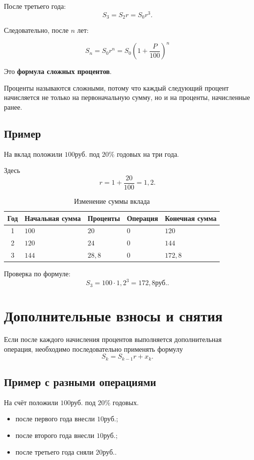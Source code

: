\documentclass[a4paper,12pt]{article}
\newcommand{\RUB}{\text{руб.}}
\newcommand{\important}[1]{\textbf{\color{darkaccent}#1}}
\newcommand{\formula}[1]{%
  \[
    \boxed{\displaystyle #1}
  \]
}
\begin{document}
После третьего года:
\[
S_3=S_2r=S_0r^3.
\]

Следовательно, после \(n\) лет:

\formula{S_n=S_0r^n
=S_0\left(1+\frac{P}{100}\right)^n}

Это \important{формула сложных процентов}.

Проценты называются сложными, потому что каждый следующий процент начисляется
не только на первоначальную сумму, но и на проценты, начисленные ранее.

\subsection{Пример}

На вклад положили \(100\RUB\) под \(20\%\) годовых на три года.

Здесь
\[
r=1+\frac{20}{100}=1{,}2.
\]

\begin{table}[ht]
\centering
\caption{Изменение суммы вклада}
\begin{tabularx}{0.9\linewidth}{@{}cXXXX@{}}
\toprule
Год &
Начальная сумма &
Проценты &
Операция &
Конечная сумма \\
\midrule
1 & \(100\) & \(20\) & \(0\) & \(120\) \\
2 & \(120\) & \(24\) & \(0\) & \(144\) \\
3 & \(144\) & \(28{,}8\) & \(0\) & \(172{,}8\) \\
\bottomrule
\end{tabularx}
\end{table}

Проверка по формуле:
\[
S_3=100\cdot1{,}2^3=172{,}8\RUB.
\]

\section{Дополнительные взносы и снятия}

Если после каждого начисления процентов выполняется дополнительная операция,
необходимо последовательно применять формулу
\[
S_k=S_{k-1}r+x_k.
\]

\subsection{Пример с разными операциями}

На счёт положили \(100\RUB\) под \(20\%\) годовых.

\begin{itemize}
  \item после первого года внесли \(10\RUB\);
  \item после второго года внесли \(10\RUB\);
  \item после третьего года сняли \(20\RUB\).
\end{itemize}
\end{document}
